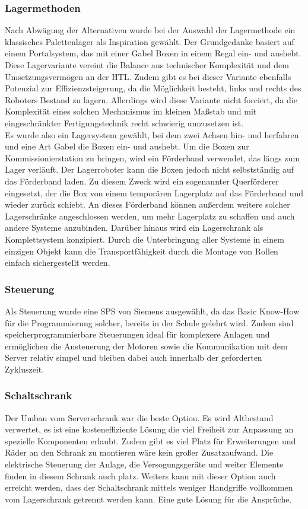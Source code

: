 \subsubsection{Lagermethoden}
Nach Abwägung der Alternativen wurde bei der Auswahl der Lagermethode ein klassisches Palettenlager als Inspiration gewählt. Der Grundgedanke basiert auf einem Portalsystem, das mit einer Gabel Boxen in einem Regal ein- und aushebt. Diese Lagervariante vereint die Balance aus technischer Komplexität und dem Umsetzungsvermögen an der HTL. Zudem gibt es bei dieser Variante ebenfalls Potenzial zur Effizienzsteigerung, da die Möglichkeit besteht, links und rechts des Roboters Bestand zu lagern. Allerdings wird diese Variante nicht forciert, da die Komplexität eines solchen Mechanismus im kleinen Maßstab und mit eingeschränkter Fertigungstechnik recht schwierig umzusetzen ist.
\\
Es wurde also ein Lagersystem gewählt, bei dem zwei Achsen hin- und herfahren und eine Art Gabel die Boxen ein- und aushebt. Um die Boxen zur Kommissionierstation zu bringen, wird ein Förderband verwendet, das längs zum Lager verläuft. Der Lagerroboter kann die Boxen jedoch nicht selbstständig auf das Förderband laden. Zu diesem Zweck wird ein sogenannter Querförderer eingesetzt, der die Box von einem temporären Lagerplatz auf das Förderband und wieder zurück schiebt. An dieses Förderband können außerdem weitere solcher Lagerschränke angeschlossen werden, um mehr Lagerplatz zu schaffen und auch andere Systeme anzubinden. Darüber hinaus wird ein Lagerschrank als Komplettsystem konzipiert. Durch die Unterbringung aller Systeme in einem einzigen Objekt kann die Transportfähigkeit durch die Montage von Rollen einfach sichergestellt werden.

\subsubsection{Steuerung}
Als Steuerung wurde eine SPS von Siemens ausgewählt, da das Basic Know-How für die Programmierung solcher, bereits in der Schule gelehrt wird. Zudem sind speicherprogrammierbare Steuerungen ideal für komplexere Anlagen und ermöglichen die Ansteuerung der Motoren sowie die Kommunikation mit dem Server relativ simpel und bleiben dabei auch innerhalb der geforderten Zykluszeit. 

\subsubsection{Schaltschrank}
Der Umbau vom Serverschrank war die beste Option. Es wird Altbestand verwertet, es ist eine kosteneffiziente Lösung die viel Freiheit zur Anpassung an spezielle Komponenten erlaubt. Zudem gibt es viel Platz für Erweiterungen und Räder an den Schrank zu montieren wäre kein großer Zusatzaufwand. Die elektrische Steuerung der Anlage, die Versogungsgeräte und weiter Elemente finden in diesem Schrank auch platz. Weiters kann mit dieser Option auch erreicht werden, dass der Schaltschrank mittels weniger Handgriffe vollkommen vom Lagerschrank getrennt werden kann.
Eine gute Lösung für die Ansprüche.

